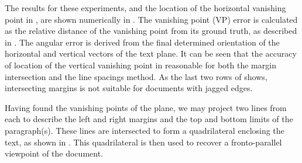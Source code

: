 
The results for these experiments, and the location of the horizontal vanishing
point in , are shown numerically in
. 
The vanishing point (VP) error is calculated as the relative distance of the
vanishing point from its ground truth, as described in . 
The angular error is derived from the final determined orientation of the
horizontal and vertical vectors of the text plane. 
It can be seen that the accuracy of location of the vertical vanishing point in
reasonable for both the margin intersection and the line spacings method. 
As the last two rows of  shows, intersecting margins is not
suitable for documents with jagged edges.


Having found the vanishing points of the plane, we may project two lines from each
to describe the left and right margins and the top and bottom limits of the
paragraph(s). 
These lines are intersected to form a quadrilateral enclosing the text,
as shown in . %
This quadrilateral is then used to recover a fronto-parallel viewpoint
of the document.






